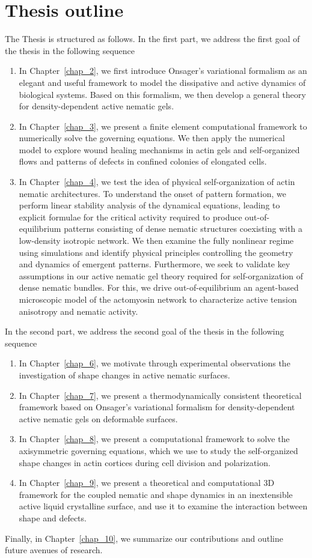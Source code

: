 \section{Thesis outline}

The Thesis is structured as follows. In the first part, we address the  first goal of the thesis in the following sequence
\begin{enumerate}
\item In Chapter~\ref{chap_2}, we first introduce Onsager's variational formalism as an elegant and useful framework to model the dissipative and active dynamics of biological systems. Based on this formalism, we then develop a general theory for density-dependent active nematic gels.
\item In Chapter~\ref{chap_3}, we present a finite element computational framework to numerically solve the governing equations. We then apply the numerical model to explore wound healing mechanisms in actin gels and self-organized flows and patterns of defects in confined colonies of elongated cells.
\item In Chapter~\ref{chap_4}, we test the idea of physical self-organization of actin nematic architectures. To understand the onset of pattern formation, we perform linear stability analysis of the dynamical equations, leading to explicit formulae for the critical activity required to produce out-of-equilibrium patterns consisting of dense nematic structures coexisting with a low-density isotropic network. We then examine the fully nonlinear regime using simulations and identify physical principles controlling the geometry and dynamics of emergent patterns.
Furthermore,  we seek to validate key assumptions in our active nematic  gel theory required for self-organization of dense nematic bundles. For this, we drive out-of-equilibrium an agent-based microscopic model of the actomyosin network to characterize active tension anisotropy and nematic activity.
\end{enumerate}

In the second part, we address the second goal of the thesis in the following sequence
\begin{enumerate}
	\item In Chapter~\ref{chap_6}, we motivate through experimental observations the investigation of shape changes in active nematic surfaces.
\item In Chapter~\ref{chap_7}, we present a  thermodynamically consistent theoretical framework based on Onsager's variational formalism for density-dependent active nematic gels on deformable surfaces.
\item In Chapter~\ref{chap_8}, we present a computational framework to solve the axisymmetric governing equations, which we use to study the self-organized shape changes in actin cortices  during cell division and polarization.
\item In Chapter~\ref{chap_9},  we present a theoretical and computational 3D framework for the coupled nematic and shape dynamics in an inextensible active liquid crystalline surface, and use it to examine the interaction between shape and defects.
\end{enumerate}
Finally, in Chapter~\ref{chap_10}, we summarize our contributions and outline future avenues of research.
